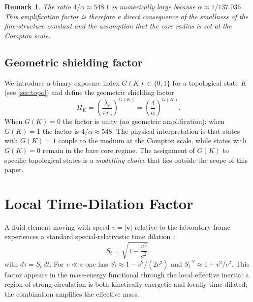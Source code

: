 \documentclass[11pt, a4paper]{article}
\newtheorem{remark}{Remark}
\newcommand{\rc}{r_c}        %
\newcommand{\lc}{\lambda_c}  %
\newcommand{\Stv}{S_t}       %
\begin{document}
\begin{remark}
The ratio $4/\alpha \approx 548.1$ is numerically large because
$\alpha \approx 1/137.036$.
This amplification factor is therefore a direct consequence of
the smallness of the fine-structure constant and the assumption
that the core radius is set at the Compton scale.
\end{remark}

\subsection{Geometric shielding factor}
\label{sec:Pik}

We introduce a binary exposure index $G(K) \in \{0,1\}$ for a
topological state $K$ (see \cref{sec:topo}) and define the
geometric shielding factor
\begin{equation}
  \Pi_K = \left(\frac{\lc}{\pi\rc}\right)^{G(K)}
         = \left(\frac{4}{\alpha}\right)^{G(K)}.
  \label{eq:Pik}
\end{equation}
When $G(K)=0$ the factor is unity (no geometric amplification);
when $G(K)=1$ the factor is $4/\alpha \approx 548$.
The physical interpretation is that states with $G(K)=1$
couple to the medium at the Compton scale, while states with
$G(K)=0$ remain in the bare core regime.
The assignment of $G(K)$ to specific topological states is a
\emph{modelling choice} that lies outside the scope of this
paper.

\section{Local Time-Dilation Factor}
\label{sec:clock}

A fluid element moving with speed $v = |\mathbf{v}|$ relative
to the laboratory frame experiences a standard special-relativistic
time dilation~\cite{Will2014,Misner1973}:
\begin{equation}
  \Stv = \sqrt{1 - \frac{v^2}{c^2}},
  \label{eq:St}
\end{equation}
with $d\tau = \Stv\,dt$.
For $v \ll c$ one has $\Stv \approx 1 - v^2/(2c^2)$ and
$\Stv^{-2} \approx 1 + v^2/c^2$.
This factor appears in the mass-energy functional through
the local effective inertia: a region of strong circulation
is both kinetically energetic and locally time-dilated; the
combination amplifies the effective mass.

\end{document}
